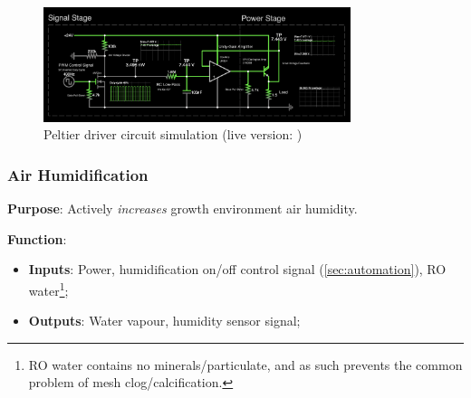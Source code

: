 \documentclass{../tex/report}
\begin{document}
\begin{figure}[h]
  \centering
  \includegraphics[width=0.8\textwidth]{images/thermosim.png}
  \hfill
  \caption{Peltier driver circuit simulation (live version: \cite{thermo-falstad})}
  \label{fig:peltierdriver}
\end{figure}

\newpage

\subsubsection{Air Humidification}
\label{sec:airhum}

\textbf{Purpose}: Actively \textit{increases} growth environment air humidity.

\textbf{Function}:
\begin{itemize}
    \item \textbf{Inputs}: Power, humidification on/off control signal (\ref{sec:automation}), RO water\footnote{RO water contains no minerals/particulate, and as such prevents the common problem of mesh clog/calcification.};
    \item \textbf{Outputs}: Water vapour, humidity sensor signal;
\end{itemize}
\end{document}
